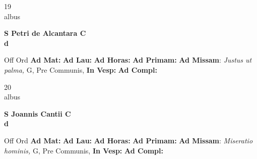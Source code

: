 \documentclass[10pt, openany]{book}
\begin{document}
    \begin{center}
        \begin{minipage}{3.5in}
            \vspace{2em}
            \begin{minipage}{0.5in}
                {\Huge 19} \\
                {\normalsize albus}
            \end{minipage}
            \begin{minipage}{3.0in}
                \textbf{ \large S Petri de Alcantara C \\
                \textnormal{\normalsize d}}

            \end{minipage}
            \begin{justify}Off Ord
                \textbf{Ad Mat: }
                \textbf{Ad Lau: }
                \textbf{Ad Horas: }
                \textbf{Ad Primam: }\textbf{Ad Missam}: \textit{Justus ut palma,} G, Pre Communis, 
                \textbf{In Vesp: }
                \textbf{Ad Compl: }
            \end{justify}
        \end{minipage}
    \end{center}

    \begin{center}
        \begin{minipage}{3.5in}
            \vspace{2em}
            \begin{minipage}{0.5in}
                {\Huge 20} \\
                {\normalsize albus}
            \end{minipage}
            \begin{minipage}{3.0in}
                \textbf{ \large S Joannis Cantii C \\
                \textnormal{\normalsize d}}

            \end{minipage}
            \begin{justify}Off Ord
                \textbf{Ad Mat: }
                \textbf{Ad Lau: }
                \textbf{Ad Horas: }
                \textbf{Ad Primam: }\textbf{Ad Missam}: \textit{Miseratio hominis,} G, Pre Communis, 
                \textbf{In Vesp: }
                \textbf{Ad Compl: }
            \end{justify}
        \end{minipage}
    \end{center}
\end{document}

